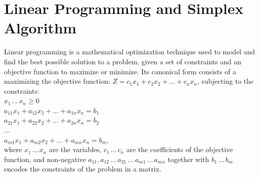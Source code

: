 \documentclass[logo,bsc,singlespacing,parskip]{infthesis}
\begin{document}
\section{Linear Programming and Simplex Algorithm}
Linear programming is a mathematical optimization technique used to model and
find the best possible solution to a problem, given a set of constraints and an
objective function to maximize or minimize. Its canonical form consists of a
maximizing the objective function:
\begin{math}
Z = c_1x_1 + c_2x_2 + ... + c_nx_n
\end{math}, subjecting to the constraints: \\
\begin{math}
x_1 \, ... \, x_n \ge 0
\end{math}\\
\begin{math}
a_{11}x_1 + a_{12}x_2 + ... + a_{1n}x_n = b_1 
\end{math}\\
\begin{math}
a_{21}x_1 + a_{22}x_2 + ... + a_{2n}x_n = b_2
\end{math}\\
\begin{math}
...
\end{math}\\
\begin{math}
a_{m1}x_1 + a_{m2}x_2 + ... + a_{mn}x_n = b_m
\end{math}, \\
where \begin{math}x_1 \,...\, x_n\end{math} are the variables, 
\begin{math}c_1 \,...\, c_n\end{math} are the coefficients of the objective function, 
and non-negative \begin{math}a_{11}, a_{12} \,...\, a_{21} \,...\ a_{m1} \,...\, a_{mn}\end{math}
together with \begin{math}b_1 \,...\, b_m\end{math} encodes the constraints of
the problem in a matrix. 

\end{document}
